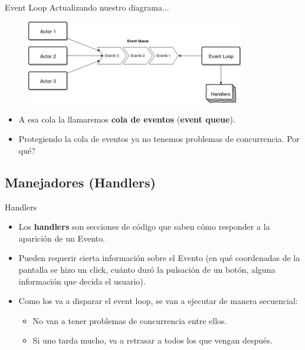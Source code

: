 \begin{frame}{Event Loop}{
  Actualizando nuestro diagrama...
}

  \begin{figure}
    \centering
    \includegraphics[width=0.85\textwidth]{./producers_to_queue_to_loop.png}
  \end{figure}

  \begin{itemize}

    \item A esa cola la llamaremos \textbf{cola de eventos} (\textbf{event queue}).

    \item Protegiendo la cola de eventos ya no tenemos problemas de concurrencia. \textquestiondown Por qu\'e?

  \end{itemize}

\end{frame}


\subsection{Manejadores (Handlers)}

\begin{frame}{Handlers}{
}

  \begin{itemize}
    \item Los \textbf{handlers} son secciones de c\'odigo que saben c\'omo responder a la aparici\'on de un Evento.

    \item Pueden requerir cierta informaci\'on sobre el Evento (en qu\'e coordenadas de la pantalla se hizo un click, cu\'anto dur\'o la pulsaci\'on de un bot\'on, alguna informaci\'on que decida el usuario).

    \item Como los va a disparar el event loop, se van a ejecutar de manera secuencial:
    \begin{itemize}
      \item No van a tener problemas de concurrencia entre ellos.
      \item Si uno tarda mucho, va a retrasar a todos los que vengan despu\'es.
    \end{itemize}

  \end{itemize}

\end{frame}

